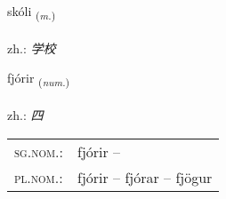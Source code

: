 \documentclass[frontgrid, backgrid]{flacards}\usepackage[]{graphicx}\usepackage[]{xcolor}
\begin{document}
\renewcommand{\flhead}{\vskip5pt \fboxsep=0pt {\small\bfseries\footnotesize Nafnorð | 名词}}
\renewcommand{\fcfoot}{\vskip5pt \fboxsep=0pt \hspace{2pt}{\small\bfseries\footnotesize 1K}}

\renewcommand{\blhead}{\vskip5pt {\small\bfseries\footnotesize Nafnorð | 名词 }}
\renewcommand{\bcfoot}{\vskip5pt \hspace{2pt}{\small\bfseries\footnotesize 1K}}


{skóli \small{\textsubscript{(\textit{m.})}} \\[1ex] %
\textphonetic{[skouːlɪ]} \\
zh.: \emph{学校} \\  [2ex]
\renewcommand*{\arraystretch}{0.8}
}

\renewcommand{\flhead}{\vskip5pt \fboxsep=0pt {\small\bfseries\footnotesize Töluorð | 数量词}}
\renewcommand{\fcfoot}{\vskip5pt \fboxsep=0pt \hspace{2pt}{\small\bfseries\footnotesize 1K}}

\renewcommand{\blhead}{\vskip5pt {\small\bfseries\footnotesize Töluorð | 数量词 }}
\renewcommand{\bcfoot}{\vskip5pt \hspace{2pt}{\small\bfseries\footnotesize 1K}}


{fjórir \small{\textsubscript{(\textit{num.})}} \\[1ex] %
\textphonetic{[fjouːrɪr]} \\
zh.: \emph{四} \\  [2ex]
\renewcommand*{\arraystretch}{0.8}
\begin{tabular}{ll}
\textsc{sg.nom.}: & fjórir  -- \\ 
\textsc{pl.nom.}: & fjórir -- fjórar -- fjögur
\end{tabular}
}
\end{document}
